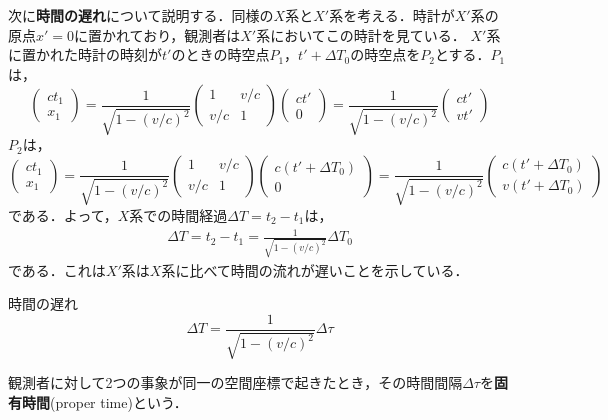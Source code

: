 \documentclass{report}
\begin{document}
  次に\textbf{時間の遅れ}について説明する．同様の$X$系と$X'$系を考える．時計が$X'$系の原点$x'=0$に置かれており，観測者は$X'$系においてこの時計を見ている．
  $X'$系に置かれた時計の時刻が$t'$のときの時空点$P_1$，$t'+\Delta T_0$の時空点を$P_2$とする．$P_1$は，
  \begin{equation}
    \begin{pmatrix}
      ct_1 \\ x_1
    \end{pmatrix}
    =
    \frac{1}{\sqrt{1 - (v/c)^2}}
    \begin{pmatrix}
      1 & v/c\\
      v/c & 1
    \end{pmatrix}
    \begin{pmatrix}
      ct'\\0
    \end{pmatrix}
    =
    \frac{1}{\sqrt{1 - (v/c)^2}}
    \begin{pmatrix}
      ct'\\vt'
    \end{pmatrix}
  \end{equation}
  $P_2$は，
  \begin{equation}
    \begin{pmatrix}
      ct_1 \\ x_1
    \end{pmatrix}
    =
    \frac{1}{\sqrt{1 - (v/c)^2}}
    \begin{pmatrix}
      1 & v/c\\
      v/c & 1
    \end{pmatrix}
    \begin{pmatrix}
      c(t' + \Delta T_0)\\0
    \end{pmatrix}
    =
    \frac{1}{\sqrt{1 - (v/c)^2}}
    \begin{pmatrix}
      c(t' + \Delta T_0)\\v(t' + \Delta T_0)
    \end{pmatrix}
  \end{equation}
  である．よって，$X$系での時間経過$\Delta T = t_2 - t_1$は，
  \begin{align}
    \Delta T = t_2 - t_1 = \frac{1}{\sqrt{1 - (v/c)^2}} \Delta T_0
  \end{align}
  である．これは$X'$系は$X$系に比べて時間の流れが遅いことを示している．
  \begin{itembox}[l]{時間の遅れ}
    \begin{equation}
      \Delta T = \frac{1}{\sqrt{1 - (v/c)^2}} \Delta \tau
    \end{equation}
  \end{itembox}
  観測者に対して2つの事象が同一の空間座標で起きたとき，その時間間隔$\Delta \tau$を\textbf{固有時間}(proper time)という．
\end{document}

